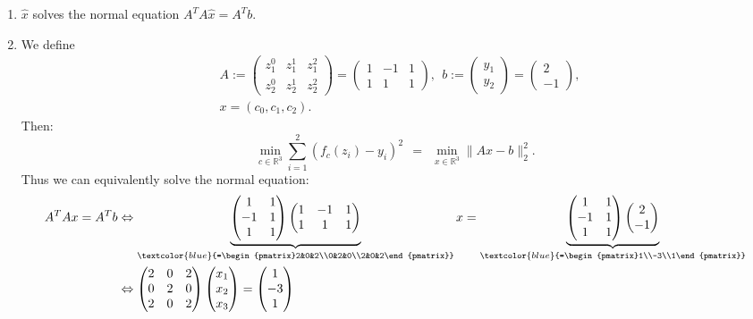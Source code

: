 {
\color{solution}
\begin{enumerate}
	\item 
	$\hat{x}$ solves the normal equation $A^TA\hat{x}=A^Tb$.
	\item 
	We define 
	\begin{align*}
	&A:=\begin{pmatrix} z_1^0&z_1^1&z_1^2\\z_2^0&z_2^1&z_2^2\end{pmatrix}=\begin{pmatrix}1&-1&1\\1&1&1\end{pmatrix},~~ b:=\begin{pmatrix}y_1\\y_2\end{pmatrix}=\begin{pmatrix}2\\-1\end{pmatrix},\\
	&x=(c_0,c_1,c_2).
	\end{align*}
	Then: 
	$$
	\min_{c\in\mathbb{R}^3} \sum_{i=1}^{2} (f_c(z_i)-y_i)^2\ \ =\ \ \min_{x\in\mathbb{R}^3} \|{Ax-b}\|_2^2.
	$$
	Thus we can equivalently solve the normal equation: 
	\begin{align*} 
	A^TAx = A^Tb &\Leftrightarrow \underbrace{\begin{pmatrix}1&1\\-1&1\\1&1\end{pmatrix}\begin{pmatrix}1&-1&1\\1&1&1\end{pmatrix}}_{\textcolor{blue}{=\begin{pmatrix}2&0&2\\0&2&0\\2&0&2\end{pmatrix}}}x =\underbrace{\begin{pmatrix}1&1\\-1&1\\1&1\end{pmatrix}\begin{pmatrix}2\\-1\end{pmatrix}}_{\textcolor{blue}{=\begin{pmatrix}1\\-3\\1\end{pmatrix}}}\\
	&\Leftrightarrow \begin{pmatrix}2&0&2\\0&2&0\\2&0&2\end{pmatrix}\begin{pmatrix}x_1\\x_2\\x_3\end{pmatrix}=\begin{pmatrix}1\\-3\\1\end{pmatrix}

\end{align*}
\end{enumerate}}
